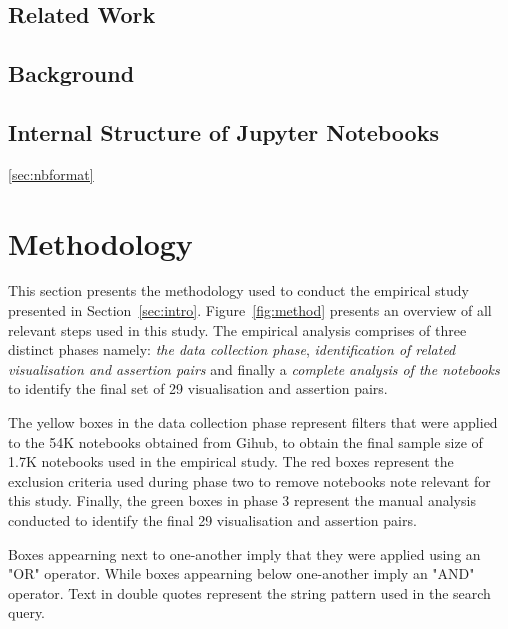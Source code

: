 \documentclass[acmsmall,screen,review,anonymous]{acmart}
\begin{document}
\subsection{Related Work}\label{sec:related}
\subsection{Background}\label{sec:background}
\subsection{Internal Structure of Jupyter Notebooks}\ref{sec:nbformat}



\section{Methodology}\label{sec:method}

This section presents the methodology used to conduct the empirical
study presented in Section~\ref{sec:intro}. Figure~\ref{fig:method}
presents an overview of all relevant steps used in this study. The
empirical analysis comprises of three distinct phases namely:
\textit{the data collection phase}, \textit{identification of related
visualisation and assertion pairs} and finally a \textit{complete
analysis of the notebooks} to identify the final set of 29
visualisation and assertion pairs.

The yellow boxes in the data collection phase represent filters that
were applied to the 54K notebooks obtained from Gihub, to obtain the
final sample size of 1.7K notebooks used in the empirical study. The red
boxes represent the exclusion criteria used during phase two to remove
notebooks note relevant for this study. Finally, the green boxes in
phase 3 represent the manual analysis conducted to identify the final 29
visualisation and assertion pairs.

Boxes appearning next to one-another imply that they were applied
using an "OR" operator. While boxes appearning below one-another imply
an "AND" operator. Text in double quotes represent the string pattern
used in the search query.
\end{document}
